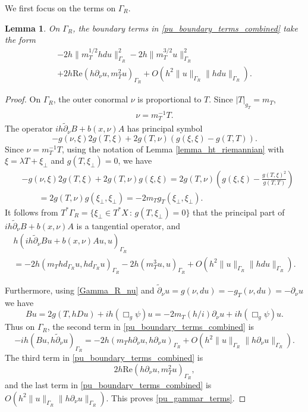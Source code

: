\documentclass[11pt,letterpaper]{amsart}
\newtheorem{Lemma}[Theorem]{Lemma}
\theoremstyle{definition}
\numberwithin{equation}{section}
\newcommand{\norm}[1]{\lVert #1 \rVert}         %
\newcommand{\p}{\partial}
\def\p{\partial}
\def\mid{\,:\,}
\begin{document}
We first focus on the terms on $\Gamma_R$.

\begin{Lemma} \label{lemma_pu_gammar_terms}
On $\Gamma_R$, the boundary terms in  \eqref{pu_boundary_terms_combined} take the form 
\begin{multline} \label{pu_gammar_terms}
- 2h \norm{m_T^{1/2} h d u}_{\Gamma_R}^2 - 2 h \norm{m_T^{3/2} u}_{\Gamma_R}^2  \\
 + 2 h \mathrm{Re}( h \p_{\nu} u, m_T^2 u)_{\Gamma_R} + O(h^2 \norm{u}_{\Gamma_R} \norm{h d u}_{\Gamma_R}).
\end{multline}
\end{Lemma}
\begin{proof}
On $\Gamma_R$, the outer conormal $\nu$ is proportional to $T$. 
Since $|T|_{g_T} = m_T$,  
    \begin{align}\label{Gamma_R_nu}
\nu = m_T^{-1} T.
    \end{align}
The operator $ih \tilde{\p}_{\nu} B + b(x,\nu) A$ has principal symbol 
\begin{equation*} %
-g(\nu, \xi) 2 g(T, \xi) + 2 g(T, \nu) (g(\xi, \xi) - g(T,T)).
\end{equation*}
Since $\nu = m_T^{-1} T$,  using the notation of Lemma \ref{lemma_ht_riemannian} with $\xi = \lambda T + \xi_{\perp}$ and $g(T, \xi_{\perp}) = 0$, we have 
\begin{align*}
&-g(\nu, \xi) 2 g(T, \xi) + 2 g(T, \nu) g(\xi, \xi) = 2 g(T, \nu)(g(\xi, \xi) - \frac{g(T,\xi)^2}{g(T,T)}) \\
 &\qquad=2 g(T, \nu) g(\xi_{\perp}, \xi_{\perp}) 
= -2 m_T g_T(\xi_{\perp}, \xi_{\perp}).
\end{align*}
It follows from $T^* \Gamma_R = \{ \xi_\perp \in T^* X \mid g(T, \xi_\perp) = 0\}$ that the principal part of $ih \tilde{\p}_{\nu} B + b(x,\nu) A$ is a tangential operator, and 
\begin{multline*}
h (i h\tilde{\p}_{\nu} Bu + b(x,\nu) Au, u)_{\Gamma_R} \\
 = -2 h (m_T h d_{\Gamma_R} u, h d_{\Gamma_R} u)_{\Gamma_R} - 2 h (m_T^3 u, u)_{\Gamma_R} + O(h^2 \norm{u}_{\Gamma_R} \norm{h d u}_{\Gamma_R}).
\end{multline*}

Furthermore, using \eqref{Gamma_R_nu} and
$\tilde{\p}_{\nu} u = g(\nu, du) = -g_T(\nu, du) = -\p_{\nu} u$
we have 
\[
Bu = 2 g(T, hDu) + ih(\Box_g \psi) u = -2 m_T (h/i) \p_{\nu} u + ih(\Box_g \psi) u.
\]
Thus on $\Gamma_R$,
the second term in \eqref{pu_boundary_terms_combined} is  
\[
 -ih(Bu, h \tilde{\p}_{\nu} u)_{\Gamma_R} = - 2 h (m_T h \p_{\nu} u, h \p_{\nu} u)_{\Gamma_R} + O(h^2 \norm{u}_{\Gamma_R} \norm{h \p_{\nu} u}_{\Gamma_R}).
\]
The third term in \eqref{pu_boundary_terms_combined} is 
\[
2h \mathrm{Re}(h \p_{\nu} u, m_T^2 u)_{\Gamma_R},
\]
and the last term in \eqref{pu_boundary_terms_combined} is $O(h^2 \norm{u}_{\Gamma_R} \norm{h \p_{\nu} u}_{\Gamma_R})$. This proves \eqref{pu_gammar_terms}.
\end{proof}
\end{document}

